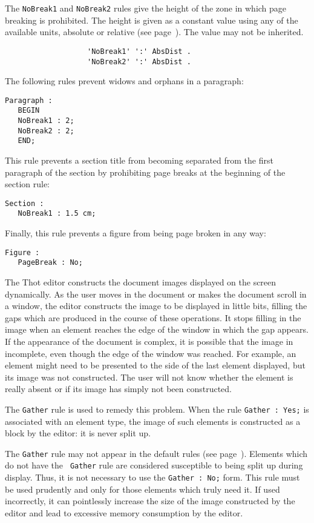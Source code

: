 The {\tt NoBreak1} and {\tt NoBreak2} rules give the height of the
zone in which page breaking is prohibited.  The height is given as a
constant value using any of the available units, absolute or relative
(see page~\pageref{unites}).  The value may not be inherited.

\begin{verbatim}
                   'NoBreak1' ':' AbsDist .
                   'NoBreak2' ':' AbsDist .
\end{verbatim}

\begin{example}
The following rules  prevent widows and orphans in a paragraph:
\begin{verbatim}
Paragraph :
   BEGIN
   NoBreak1 : 2;
   NoBreak2 : 2;
   END;
\end{verbatim}
This rule prevents a section title from becoming separated from the
first paragraph of the section by prohibiting page breaks at the
beginning of the section rule:
\begin{verbatim}
Section :
   NoBreak1 : 1.5 cm;
\end{verbatim}

Finally, this rule prevents a figure from being page broken in any way:
\begin{verbatim}
Figure :
   PageBreak : No;
\end{verbatim}
\end{example}

The Thot editor constructs the document images displayed on the screen
dynamically.  As the user moves in the document or makes the document
scroll in a window, the editor constructs the image to be displayed in
little bits, filling the gaps which are produced in the course of
these operations.  It stops filling in the image when an element
reaches the edge of the window in which the gap appears.  If the
appearance of the document is complex, it is possible that the image
in incomplete, even though the edge of the window was reached.  For
example, an element might need to be presented to the side of the last
element displayed, but its image was not constructed.  The user will
not know whether the element is really absent or if its image has
simply not been constructed.

The {\tt Gather} rule is used to remedy this problem.  When the rule
{\tt Gather : Yes;} is associated with an element type, the image of
such elements is constructed as a block by the editor: it is never
split up.

The {\tt Gather} rule may not appear in the default rules (see
page~\pageref{reglesdefaut}).  Elements which do not have the {\tt
Gather} rule are considered susceptible to being split up during
display.  Thus, it is not necessary to use the {\tt Gather : No;}
form.  This rule must be used prudently and only for those elements
which truly need it.  If used incorrectly, it can pointlessly increase
the size of the image constructed by the editor and lead to excessive
memory consumption by the editor.

